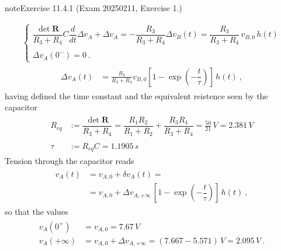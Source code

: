 \documentclass[letterpaper,10pt,english]{jupyterBook}
\begin{document}
\begin{sphinxadmonition}{note}{Exercise 11.4.1 (Exam 2025\sphinxhyphen{}02\sphinxhyphen{}11, Exercise 1.)}
\begin{itemize}
\begin{equation*}
\begin{split}
\begin{cases}
     \dfrac{\det \mathbf{R}}{R_3 + R_4} C  \dfrac{d}{dt}\Delta v_A + \Delta v_{A} = - \dfrac{R_3}{R_3 + R_4} \Delta v_{B}(t) = \dfrac{R_3}{R_3 + R_4} \, v_{B,0} \, h(t) \\ \\
     \Delta v_A(0^-) = 0 \ .
   \end{cases}\end{split}
\end{equation*}\begin{equation*}
\begin{split}\begin{aligned}
     \Delta v_A(t)
     & = \frac{R_3}{R_3 + R_4} v_{B,0} \left[ 1 - \exp\left( - \dfrac{t}{\tau} \right) \right] \, h(t) \ ,
   \end{aligned}\end{split}
\end{equation*}
\sphinxAtStartPar
having defined the time constant and the equivalent reistence seen by the capacitor
\begin{equation*}
\begin{split}\begin{aligned}
     R_{eq} & := \dfrac{\det \mathbf{R}}{R_3+R_4} = \dfrac{R_1 R_2}{R_1 + R_2} + \dfrac{R_3 R_4}{R_3 + R_4} = \frac{50}{21} \, V = 2.381 \, V  \\ \\
     \tau   & := R_{eq} C = 1.1905 \, s 
   \end{aligned}\end{split}
\end{equation*}
\sphinxAtStartPar
Tension through the capacitor reads
\begin{equation*}
\begin{split}\begin{aligned}
     v_A(t) 
     & = v_{A,0} + \delta v_A(t) = \\
     & = v_{A,0} + \Delta v_{A,+\infty} \, \left[ 1 - \exp\left( - \dfrac{t}{\tau} \right) \right] \, h(t) \ , 
   \end{aligned}\end{split}
\end{equation*}
\sphinxAtStartPar
so that the values
\begin{equation*}
\begin{split}\begin{aligned} 
     v_A(0^+)     & = v_{A,0} = 7.67 \, V \\
     v_A(+\infty) & = v_{A,0} + \Delta v_{A,+\infty} = ( 7.667 - 5.571 ) \, V = 2.095 \, V \ .
   \end{aligned}\end{split}

\end{equation*}
\end{itemize}
\end{sphinxadmonition}
\end{document}
